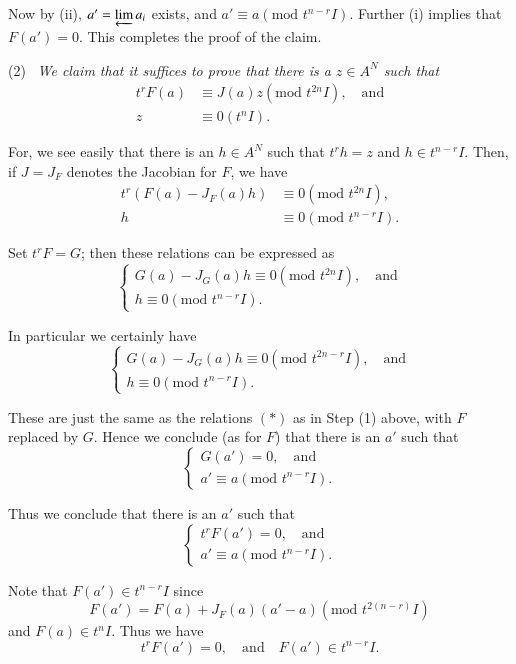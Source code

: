 Now by (ii), $a'=\varprojlim a_{i}$ exists, and $a'\equiv
a(\text{mod~}t^{n-r}I)$. Further (i) implies that $F(a')=0$. This
completes the proof of the claim.

\smallskip
(2)~ {\em We claim that it suffices to prove that there is a $z\in
  A^{N}$ such that}
\begin{align*}
t^{r}F(a) &\equiv J(a)z(\text{mod~}t^{2n}I),\quad\text{and}\\
z &\equiv 0(t^{n}I).
\end{align*}\pageoriginale

For, we see easily that there is an $h\in A^{N}$ such that $t^{r}h=z$
and $h\in t^{n-r}I$. Then, if $J=J_{F}$ denotes the Jacobian for $F$,
we have
\begin{align*}
t^{r}(F(a)-J_{F}(a)h) &\equiv 0(\text{mod~}t^{2n}I),\\
h &\equiv 0(\text{mod~}t^{n-r}I).
\end{align*}

Set $t^{r}F=G$; then these relations can be expressed as
$$
\begin{cases}
G(a)-J_{G}(a)h\equiv 0(\text{mod~}t^{2n}I),\quad\text{and}\\
h\equiv 0(\text{mod~}t^{n-r}I).
\end{cases}
$$

In particular we certainly have
\begin{equation*}
\begin{cases}
G(a)-J_{G}(a)h\equiv 0(\text{mod~}t^{2n-r}I),\quad\text{and}\\
h\equiv 0(\text{mod~}t^{n-r}I).
\end{cases}\tag{**}
\end{equation*}

These are just the same as the relations $(*)$ as in Step (1) above,
with $F$ replaced by $G$. Hence we conclude (as for $F$) that there is
an $a'$ such that 
$$
\begin{cases}
G(a')=0,\quad\text{and}\\
a'\equiv a(\text{mod~}t^{n-r}I).
\end{cases}
$$

Thus we conclude that there is an $a'$ such that
$$
\begin{cases}
t^{r}F(a')=0,\quad\text{and}\\
a'\equiv a(\text{mod~}t^{n-r}I).
\end{cases}
$$

Note that $F(a')\in t^{n-r}I$ since
$$
F(a')=F(a)+J_{F}(a)(a'-a)(\text{mod~}t^{2(n-r)}I)
$$
and $F(a)\in t^{n}I$. Thus we have
$$
t^{r}F(a')=0,\quad\text{and}\quad F(a')\in t^{n-r}I.
$$\pageoriginale


